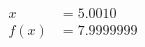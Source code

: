 \documentclass[preview]{standalone}
\begin{document}
\begin{align*}
x &= 5.0010\\f(x) &= 7.9999999
\end{align*}
\end{document}
